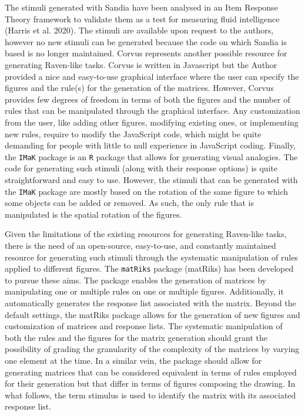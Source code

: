 \documentclass[
]{article}
\begin{document}
The stimuli generated with Sandia have been analysed in an Item Response
Theory framework to validate them as a test for measuring fluid
intelligence (Harris et al. 2020). The stimuli are available upon
request to the authors, however no new stimuli can be generated because
the code on which Sandia is based is no longer maintained. Corvus
represents another possible resource for generating Raven-like tasks.
Corvus is written in Javascript but the Author provided a nice and
easy-to-use graphical interface where the user can specify the figures
and the rule(s) for the generation of the matrices. However, Corvus
provides few degrees of freedom in terms of both the figures and the
number of rules that can be manipulated through the graphical interface.
Any customization from the user, like adding other figures, modifying
existing ones, or implementing new rules, require to modify the
JavaScript code, which might be quite demanding for people with little
to null experience in JavaScript coding. Finally, the \texttt{IMaK}
package is an \texttt{R} package that allows for generating visual
analogies. The code for generating such stimuli (along with their
response options) is quite straightforward and easy to use. However, the
stimuli that can be generated with the \texttt{IMaK} package are mostly
based on the rotation of the same figure to which some objects can be
added or removed. As such, the only rule that is manipulated is the
spatial rotation of the figures.

Given the limitations of the existing resources for generating
Raven-like tasks, there is the need of an open-source, easy-to-use, and
constantly maintained resource for generating such stimuli through the
systematic manipulation of rules applied to different figures. The
\texttt{matRiks} package (matRiks) has been developed to pursue these
aims. The package enables the generation of matrices by manipulating one
or multiple rules on one or multiple figures. Additionally, it
automatically generates the response list associated with the matrix.
Beyond the default settings, the matRiks package allows for the
generation of new figures and customization of matrices and response
lists. The systematic manipulation of both the rules and the figures for
the matrix generation should grant the possibility of grading the
granularity of the complexity of the matrices by varying one element at
the time. In a similar vein, the package should allow for generating
matrices that can be considered equivalent in terms of rules employed
for their generation but that differ in terms of figures composing the
drawing. In what follows, the term stimulus is used to identify the
matrix with its associated response list.
\end{document}

